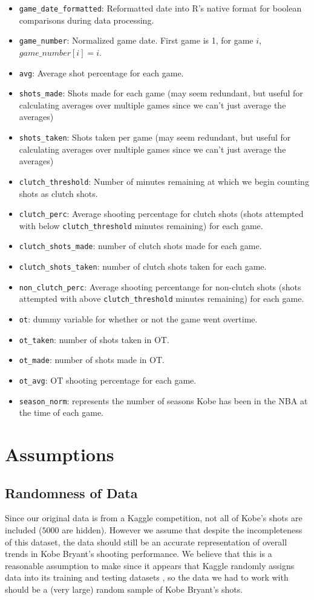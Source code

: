 \documentclass[paper=a4, fontsize=11pt]{scrartcl} %
\numberwithin{equation}{section} %
\numberwithin{figure}{section} %
\numberwithin{table}{section} %
\begin{document}
\begin{itemize}
	\item \texttt{game\_date\_formatted}: Reformatted date into R's native format for boolean comparisons during data processing. 
	\item \texttt{game\_number}: Normalized game date. First game is 1, for game $i$, $game\_number[i] = i$.
	\item \texttt{avg}: Average shot percentage for each game.
	\item \texttt{shots\_made}: Shots made for each game (may seem redundant, but useful for calculating averages over multiple games since we can't just average the averages)
	\item \texttt{shots\_taken}: Shots taken per game (may seem redundant, but useful for calculating averages over multiple games since we can't just average the averages)
	\item \texttt{clutch\_threshold}: Number of minutes remaining at which we begin counting shots as clutch shots.
	\item \texttt{clutch\_perc}: Average shooting percentage for clutch shots (shots attempted with below \texttt{clutch\_threshold} minutes remaining) for each game.
	\item \texttt{clutch\_shots\_made}: number of clutch shots made for each game.
	\item \texttt{clutch\_shots\_taken}: number of clutch shots taken for each game. 
	\item \texttt{non\_clutch\_perc}: Average shooting percentange for non-clutch shots (shots attempted with above \texttt{clutch\_threshold} minutes remaining) for each game. 
	\item \texttt{ot}: dummy variable for whether or not the game went overtime.
	\item \texttt{ot\_taken}: number of shots taken in OT.
	\item \texttt{ot\_made}: number of shots made in OT.
	\item \texttt{ot\_avg}: OT shooting percentage for each game.
	\item \texttt{season\_norm}: represents the number of seasons Kobe has been in the NBA at the time of each game.

	\end{itemize}
\section{Assumptions}
\subsection{Randomness of Data}
\hspace*{1cm}Since our original data is from a Kaggle competition, not all of Kobe's shots are included ($5000$ are hidden). However we assume that despite the incompleteness of this dataset, the data should still be an accurate representation of overall trends in Kobe Bryant's shooting performance. We believe that this is a reasonable assumption to make since it appears that Kaggle randomly assigns data into its training and testing datasets \cite{forumpost}, so the data we had to work with should be a (very large) random sample of Kobe Bryant's shots.
\end{document}
